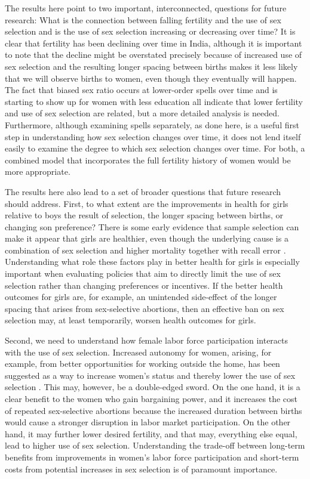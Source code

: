 \documentclass[12pt,letterpaper]{article}
\begin{document}
The results here point to two important, interconnected, questions 
for future research:
What is the connection between falling fertility and the 
use of sex selection and is the use of sex selection increasing 
or decreasing over time?
It is clear that fertility has been declining over time in India,
although it is important to note that the decline might be
overstated precisely because of increased use of sex selection and
the resulting longer spacing between births makes it less likely 
that we will observe births to women, even though they eventually
will happen.
The fact that biased sex ratio occurs at lower-order spells over
time and is starting to show up for women with less education 
all indicate that lower fertility and use of sex selection are
related, but a more detailed analysis is needed.
Furthermore, although examining spells separately, as done here, is a useful
first step in understanding how sex selection changes over time,
it does not lend itself easily to examine the degree to which
sex selection changes over time.
For both, a combined model that incorporates the full fertility
history of women would be more appropriate.


The results here also lead to a set of broader questions that
future research should address.
First, to what extent are the improvements in health for girls
relative to boys the result of selection, the longer spacing between
births, or changing son preference?
There is some early evidence that sample selection can make it appear that
girls are healthier, even though the underlying cause is a combination
of sex selection and higher mortality together with recall 
error \citep{Portner2018a}. 
Understanding what role these factors play in better health for
girls is especially important when evaluating policies that 
aim to directly limit the use of sex selection rather than 
changing preferences or incentives.
If the better health outcomes for girls are, for example, an unintended 
side-effect of the longer spacing that arises from sex-selective 
abortions, then an effective ban on sex selection may, at least
temporarily, worsen health outcomes for girls.


Second, we need to understand how female labor force participation
interacts with the use of sex selection.
Increased autonomy for women, arising, for example, from better opportunities
for working outside the home, has been suggested as a way to increase
women's status and thereby lower the use of sex selection \citep{Das-Gupta2016}.
This may, however, be a double-edged sword.
On the one hand, it is a clear benefit to the women who gain  
bargaining power, and it increases the cost of repeated 
sex-selective abortions because the increased duration between births
would cause a stronger disruption in labor market participation.
On the other hand, it may further lower desired fertility, and 
that may, everything else equal, lead to higher use of sex selection.
Understanding the trade-off between long-term benefits from improvements in
women's labor force participation and short-term costs from potential 
increases in sex selection is of paramount importance.
\end{document}
